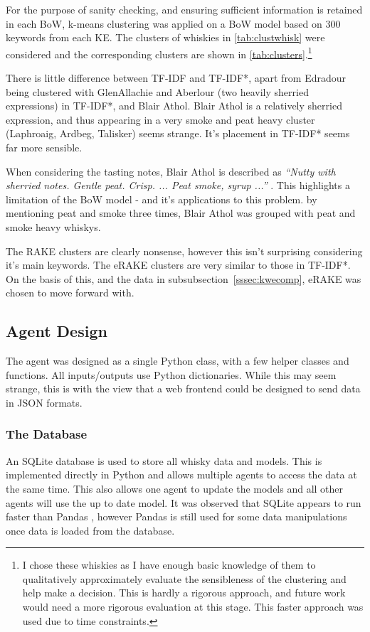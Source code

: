 For the purpose of sanity checking, and ensuring sufficient information is retained in each BoW,
k-means clustering was applied on a BoW model based on 300 keywords from each KE. The clusters of whiskies in 
\autoref{tab:clustwhisk} were considered and the corresponding clusters are shown in \autoref{tab:clusters}.\footnote{I
chose these whiskies as I have enough basic knowledge of them to qualitatively approximately evaluate the sensibleness
of the clustering and help make a decision. This is hardly a rigorous approach, and future work would need a more rigorous
evaluation at this stage.  This faster approach was used due to time constraints.}

There is little difference between TF-IDF and TF-IDF*, apart from Edradour being clustered with GlenAllachie and Aberlour 
(two heavily sherried expressions) in TF-IDF*, and Blair Athol.  Blair Athol is a relatively sherried expression,
and thus appearing in a very smoke and peat heavy cluster (Laphroaig, Ardbeg, Talisker) seems strange. It's placement in 
TF-IDF* seems far more sensible.

When considering the tasting notes, Blair Athol is described as 
\emph{``Nutty with sherried notes. Gentle peat. Crisp. ... Peat smoke, syrup ...''} \cite{mom_ba}.  This highlights a limitation
of the BoW model - and it's applications to this problem. by mentioning peat and smoke three times, Blair Athol was grouped
with peat and smoke heavy whiskys.

The RAKE clusters are clearly nonsense, however this isn't surprising considering it's main keywords. The eRAKE clusters
are very similar to those in TF-IDF*.  On the basis of this, and the data in subsubsection~\ref{sssec:kwecomp}, eRAKE was chosen to move forward with.

\subsection{Agent Design}\label{ssec:phase2}
The agent was designed as a single Python class, with a few helper classes and functions.  
All inputs/outputs use Python dictionaries.  While this may seem strange, this is with the view that a web frontend
could be designed to send data in JSON formats.

\subsubsection{The Database}\label{sssec:db}
An SQLite database is used to store all whisky data and models.  This is implemented directly in Python and
allows multiple agents to access the data at the same time.  This also allows one agent to update the models
and all other agents will use the up to date model.  It was observed that SQLite appears to run faster than 
Pandas \cite{reback2020pandas}, however Pandas is still used 
for some data manipulations once data is loaded from the database.

